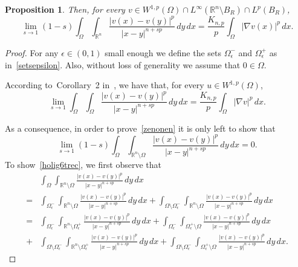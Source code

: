 \documentclass[12pt]{article}
\newcommand{\R}{\mathbb{R}}
\numberwithin{equation}{section}
\newtheorem{prop}[thm]{Proposition}
\begin{document}
\begin{appendix}
\begin{prop}
Then, for every  $v\in W^{1,p}(\Omega)\cap L^\infty(\R^n\setminus B_R)\cap L^p(B_R)$,
\begin{equation}\label{zenonen}
\lim_{s\to 1}(1-s)\int_{\Omega}\int_{\R^n} \frac{\left|v(x)-v(y)\right|^p}{\left|x-y\right|^{n+sp}}\,dy\,dx =\frac{K_{n,p}}{p}\int_{\Omega}\left|\nabla v(x)\right|^p\,dx.
\end{equation}
\end{prop}

\begin{proof}
For any $\epsilon\in (0,1)$ small enough we define the sets $\Omega_{\epsilon}^{-}$ and $\Omega_{\epsilon}^{+}$ as in~\eqref{setsepsilon}. Also, without loss of generality we assume that $0\in \Omega$. 

According to~Corollary~2 in~\cite{MR3586796}, we have that, for every $u\in W^{1,p}(\Omega)$,
\begin{equation*}
\lim_{s\to 1}\int_{\Omega}\int_{\Omega} \frac{\left|v(x)-v(y)\right|^p}{\left|x-y\right|^{n+sp}}\,dy\,dx= \frac{K_{n,p}}{p}\int_{\Omega}\left|\nabla v\right|^p\,dx.
\end{equation*}

As a consequence, in order to prove~\eqref{zenonen} it is only left to show that 
\begin{equation}\label{holig6trec}
\lim_{s\to 1} (1-s)\int_{\Omega}\int_{\R^n\setminus \Omega} \frac{\left|v(x)-v(y)\right|^p}{\left|x-y\right|^{n+sp}}\,dy\,dx=0.
\end{equation}
To show~\eqref{holig6trec}, we first observe that  
\begin{equation}\label{Cbvdkbgrvc5663}
\begin{split}
&\int_{\Omega}\int_{\R^n\setminus \Omega} \frac{\left|v(x)-v(y)\right|^p}{\left|x-y\right|^{n+sp}}\,dy\,dx\\
=& \int_{\Omega_{\epsilon}^{-}}\int_{\R^n\setminus\Omega} \frac{\left|v(x)-v(y)\right|^p}{\left|x-y\right|^{n+sp}}\,dy\,dx+ \int_{\Omega\setminus \Omega_{\epsilon}^{-}}\int_{\R^n\setminus\Omega} \frac{\left|v(x)-v(y)\right|^p}{\left|x-y\right|^{n+sp}}\,dy\,dx\\
=&\int_{\Omega_{\epsilon}^{-}}\int_{\R^n\setminus\Omega_{\epsilon}^{+}} \frac{\left|v(x)-v(y)\right|^p}{\left|x-y\right|^{n+sp}}\,dy\,dx+ \int_{\Omega_{\epsilon}^{-}}\int_{\Omega_{\epsilon}^{+}\setminus \Omega} \frac{\left|v(x)-v(y)\right|^p}{\left|x-y\right|^{n+sp}}\,dy\,dx\\
+& \int_{\Omega\setminus \Omega_{\epsilon}^{-}}\int_{\R^n\setminus\Omega_{\epsilon}^{+}} \frac{\left|v(x)-v(y)\right|^p}{\left|x-y\right|^{n+sp}}\,dy\,dx+\int_{\Omega\setminus \Omega_{\epsilon}^{-}}\int_{\Omega_{\epsilon}^{+}\setminus \Omega } \frac{\left|v(x)-v(y)\right|^p}{\left|x-y\right|^{n+sp}}\,dy\,dx.
\end{split}
\end{equation}  


\end{proof}
\end{appendix}
\end{document}
